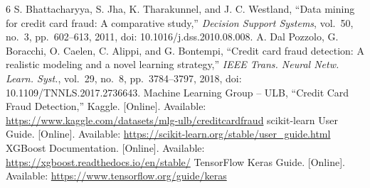 \documentclass[journal]{IEEEtran}
\begin{document}
\begin{thebibliography}{6}
 S. Bhattacharyya, S. Jha, K. Tharakunnel, and J. C. Westland, ``Data mining for credit card fraud: A comparative study,'' \emph{Decision Support Systems}, vol.~50, no.~3, pp.~602--613, 2011, doi: 10.1016/j.dss.2010.08.008.
 A. Dal Pozzolo, G. Boracchi, O. Caelen, C. Alippi, and G. Bontempi, ``Credit card fraud detection: A realistic modeling and a novel learning strategy,'' \emph{IEEE Trans. Neural Netw. Learn. Syst.}, vol.~29, no.~8, pp.~3784--3797, 2018, doi: 10.1109/TNNLS.2017.2736643.
 Machine Learning Group -- ULB, ``Credit Card Fraud Detection,'' Kaggle. [Online]. Available: \url{https://www.kaggle.com/datasets/mlg-ulb/creditcardfraud}
 scikit-learn User Guide. [Online]. Available: \url{https://scikit-learn.org/stable/user_guide.html}
 XGBoost Documentation. [Online]. Available: \url{https://xgboost.readthedocs.io/en/stable/}
 TensorFlow Keras Guide. [Online]. Available: \url{https://www.tensorflow.org/guide/keras}
\end{thebibliography}
\end{document}
